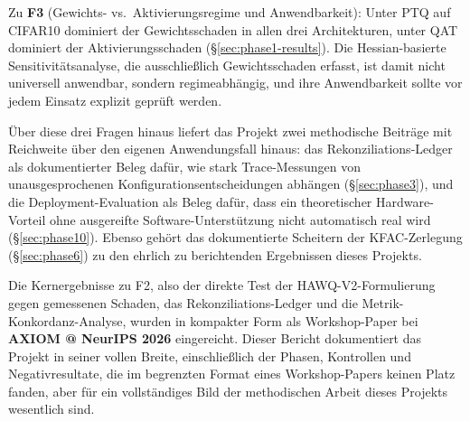 Zu \textbf{F3} (Gewichts- vs.\ Aktivierungsregime und Anwendbarkeit): Unter PTQ auf CIFAR10 dominiert der Gewichtsschaden in allen drei Architekturen, unter QAT dominiert der Aktivierungsschaden (\S\ref{sec:phase1-results}). Die Hessian-basierte Sensitivitätsanalyse, die ausschließlich Gewichtsschaden erfasst, ist damit nicht universell anwendbar, sondern regimeabhängig, und ihre Anwendbarkeit sollte vor jedem Einsatz explizit geprüft werden.
\par\medskip

Über diese drei Fragen hinaus liefert das Projekt zwei methodische Beiträge mit Reichweite über den eigenen Anwendungsfall hinaus: das Rekonziliations-Ledger als dokumentierter Beleg dafür, wie stark Trace-Messungen von unausgesprochenen Konfigurationsentscheidungen abhängen (\S\ref{sec:phase3}), und die Deployment-Evaluation als Beleg dafür, dass ein theoretischer Hardware-Vorteil ohne ausgereifte Software-Unterstützung nicht automatisch real wird (\S\ref{sec:phase10}). Ebenso gehört das dokumentierte Scheitern der KFAC-Zerlegung (\S\ref{sec:phase6}) zu den ehrlich zu berichtenden Ergebnissen dieses Projekts.
\par\medskip

Die Kernergebnisse zu F2, also der direkte Test der HAWQ-V2-Formulierung gegen gemessenen Schaden, das Rekonziliations-Ledger und die Metrik-Konkordanz-Analyse, wurden in kompakter Form als Workshop-Paper bei \textbf{AXIOM @ NeurIPS 2026} eingereicht. Dieser Bericht dokumentiert das Projekt in seiner vollen Breite, einschließlich der Phasen, Kontrollen und Negativresultate, die im begrenzten Format eines Workshop-Papers keinen Platz fanden, aber für ein vollständiges Bild der methodischen Arbeit dieses Projekts wesentlich sind.
